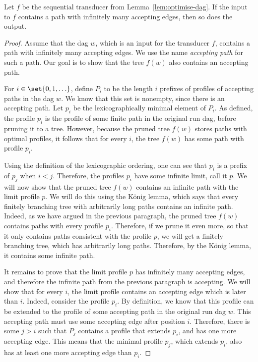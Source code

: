  
\begin{lemma}\label{lem:optimal-is-accepting}
Let $f$ be the sequential transducer from Lemma~\ref{lem:optimise-dag}. If the input to $f$ contains a path with infinitely many accepting edges, then so does the output.
\end{lemma}
\begin{proof}
	Assume that the dag  $w$, which is an input for the transducer $f$, contains a path with infinitely many accepting edges. We use the name \emph{accepting path} for such a path. Our goal is to show that the tree $f(w)$ also contains an accepting path.
	
	For $i \in \set{0,1,\ldots}$, define $P_i$ to be the length $i$ prefixes of profiles of accepting paths in the dag $w$. We know that this set is nonempty, since there is an accepting path. Let $p_i$ be the lexicographically minimal element of $P_i$. As defined, the profile $p_i$ is the profile of some finite path in the original run dag, before pruning it to a tree. However, because the pruned tree $f(w)$ stores paths with optimal profiles, it follows that for   every $i$, the tree $f(w)$ has  some path with profile $p_i$.
	
	

	Using the definition of the lexicographic ordering, one can see that  $p_i$ is a prefix of $p_j$ when $i < j$. Therefore, the profiles $p_i$ have some infinite limit, call it $p$. We will now show that the pruned tree $f(w)$ contains an infinite path with the limit profile $p$. We will do this using the König lemma, which says that every finitely branching tree with arbitrarily long paths contains an infinite path. Indeed, as we have argued in the previous paragraph, the pruned tree $f(w)$ contains paths with every profile $p_i$. Therefore, if we prune it even more, so that it only contains paths consistent with the profile $p$, we will get a finitely branching tree, which has arbitrarily long paths. Therefore, by the König lemma, it contains some infinite path.
	
	It remains to prove that the limit profile $p$ has infinitely many accepting edges, and therefore the infinite path from the previous paragraph is accepting. We will show that for every $i$, the limit profile contains an accepting edge which is later than $i$. Indeed, consider the profile $p_i$. By definition, we know that this profile can be extended to the profile of some accepting path  in the original run dag $w$. This accepting path must use some accepting edge after position $i$. Therefore, there is  some $j > i$ such that  $P_j$ contains a profile that extends $p_i$, and has one more accepting edge. This means that the minimal profile $p_j$, which extends $p_i$, also has at least one more accepting edge than $p_i$. 
\end{proof}






